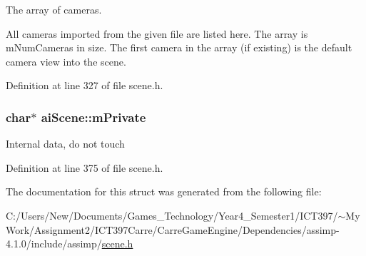 The array of cameras.

All cameras imported from the given file are listed here. The array is mNumCameras in size. The first camera in the array (if existing) is the default camera view into the scene. 

Definition at line 327 of file scene.h.\hypertarget{structai_scene_dc5fcf5c4ef86a45f721560d6c1a4923}{
\subsubsection[mPrivate]{\setlength{\rightskip}{0pt plus 5cm}char$\ast$ {\bf aiScene::mPrivate}}}
\label{structai_scene_dc5fcf5c4ef86a45f721560d6c1a4923}


Internal data, do not touch 

Definition at line 375 of file scene.h.

The documentation for this struct was generated from the following file:\begin{CompactItemize}
\item 
C:/Users/New/Documents/Games\_\-Technology/Year4\_\-Semester1/ICT397/$\sim$My Work/Assignment2/ICT397Carre/CarreGameEngine/Dependencies/assimp-4.1.0/include/assimp/\hyperlink{scene_8h}{scene.h}\end{CompactItemize}
